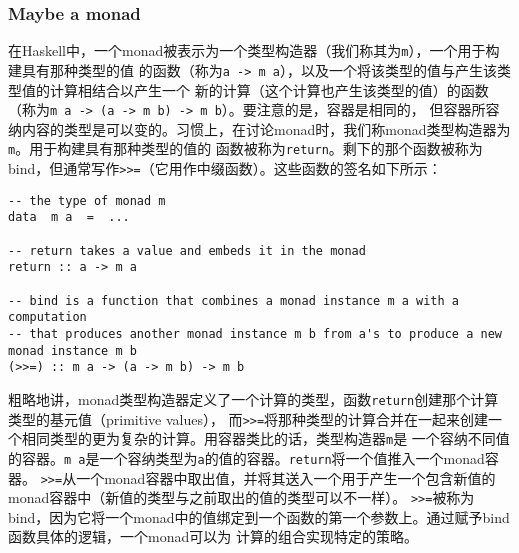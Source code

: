 \subsubsection{Maybe a monad}
在Haskell中，一个monad被表示为一个类型构造器（我们称其为\texttt{m}），一个用于构建具有那种类型的值
的函数（称为\texttt{a -> m a}），以及一个将该类型的值与产生该类型值的计算相结合以产生一个
新的计算（这个计算也产生该类型的值）的函数（称为\texttt{m a -> (a -> m b) -> m b}）。要注意的是，容器是相同的，
但容器所容纳内容的类型是可以变的。习惯上，在讨论monad时，我们称monad类型构造器为\texttt{m}。用于构建具有那种类型的值的
函数被称为\texttt{return}。剩下的那个函数被称为bind，但通常写作\texttt{>>=}（它用作中缀函数）。这些函数的签名如下所示：
\begin{verbatim}
-- the type of monad m
data  m a  =  ...

-- return takes a value and embeds it in the monad
return :: a -> m a

-- bind is a function that combines a monad instance m a with a computation
-- that produces another monad instance m b from a's to produce a new monad instance m b
(>>=) :: m a -> (a -> m b) -> m b
\end{verbatim}
\indent{}粗略地讲，monad类型构造器定义了一个计算的类型，函数\texttt{return}创建那个计算类型的基元值（primitive values），
而\texttt{>>=}将那种类型的计算合并在一起来创建一个相同类型的更为复杂的计算。用容器类比的话，类型构造器\texttt{m}是
一个容纳不同值的容器。\texttt{m a}是一个容纳类型为\texttt{a}的值的容器。\texttt{return}将一个值推入一个monad容器。
\texttt{>>=}从一个monad容器中取出值，并将其送入一个用于产生一个包含新值的monad容器中（新值的类型与之前取出的值的类型可以不一样）。
\texttt{>>=}被称为bind，因为它将一个monad中的值绑定到一个函数的第一个参数上。通过赋予bind函数具体的逻辑，一个monad可以为
计算的组合实现特定的策略。

